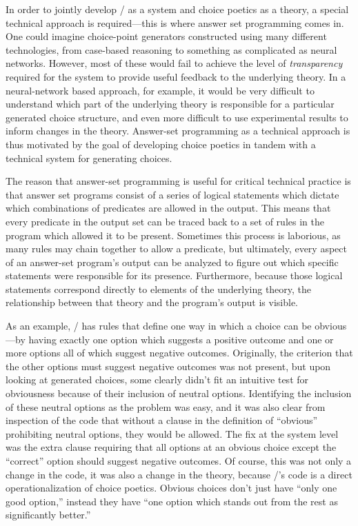 In order to jointly develop \dunyazad/ as a system and choice poetics as a theory, a special technical approach is required---this is where answer set programming comes in.
%
One could imagine choice-point generators constructed using many different technologies, from case-based reasoning to something as complicated as neural networks.
%
However, most of these would fail to achieve the level of \emph{transparency} required for the system to provide useful feedback to the underlying theory.
%
In a neural-network based approach, for example, it would be very difficult to understand which part of the underlying theory is responsible for a particular generated choice structure, and even more difficult to use experimental results to inform changes in the theory.
%
Answer-set programming as a technical approach is thus motivated by the goal of developing choice poetics in tandem with a technical system for generating choices.


The reason that answer-set programming is useful for critical technical practice is that answer set programs consist of a series of logical statements which dictate which combinations of predicates are allowed in the output.
%
This means that every predicate in the output set can be traced back to a set of rules in the program which allowed it to be present.
%
Sometimes this process is laborious, as many rules may chain together to allow a predicate, but  ultimately, every aspect of an answer-set program's output can be analyzed to figure out which specific statements were responsible for its presence.
%
Furthermore, because those logical statements correspond directly to elements of the underlying theory, the relationship between that theory and the program's output is visible.


As an example, \dunyazad/ has rules that define one way in which a choice can be obvious---by having exactly one option which suggests a positive outcome and one or more options all of which suggest negative outcomes.
%
Originally, the criterion that the other options must suggest negative outcomes was not present, but upon looking at generated choices, some clearly didn't fit an intuitive test for obviousness because of their inclusion of neutral options.
%
Identifying the inclusion of these neutral options as the problem was easy, and it was also clear from inspection of the code that without a clause in the definition of ``obvious'' prohibiting neutral options, they would be allowed.
%
The fix at the system level was the extra clause requiring that all options at an obvious choice except the ``correct'' option should suggest negative outcomes.
%
Of course, this was not only a change in the code, it was also a change in the theory, because \dunyazad/'s code is a direct operationalization of choice poetics.
%
Obvious choices don't just have ``only one good option,'' instead they have ``one option which stands out from the rest as significantly better.''


